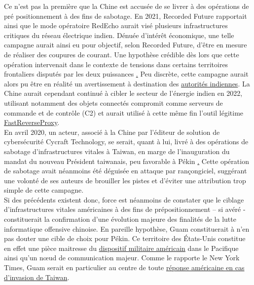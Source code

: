 \documentclass[a4paper]{article}
\begin{document}
Ce n’est pas la première que la Chine est accusée de se livrer à des opérations de pré positionnement à des fins de sabotage. En 2021, Recorded Future rapportait ainsi que le mode opératoire RedEcho aurait visé plusieurs infrastructures critiques du réseau électrique indien. Dénuée d’intérêt économique, une telle campagne aurait ainsi eu pour objectif, selon Recorded Future, d’être en mesure de réaliser des coupures de courant. Une hypothèse crédible dès lors que cette opération intervenait dans le contexte de tensions dans certains territoires frontaliers disputés par les deux puissances \href{https://troopers.de/downloads/troopers22/TR22_TinkerTelcoSoldierSpy.pdf}. Peu discrète, cette campagne aurait alors pu être en réalité un avertissement à destination des \href{https://www.intrinsec.com/wp-content/uploads/2023/04/Intrinsec-TLP_White_report_-Final.pdf}
{autorités indiennes}. La Chine aurait cependant continué à cibler le secteur de l’énergie indien en 2022, utilisant notamment des objets connectés compromit comme serveurs de commande et de contrôle (C2) et aurait utilisé à cette même fin l’outil légitime \href{https://www.microsoft.com/en-us/security/blog/2023/05/24/volt-typhoon-targets-us-critical-infrastructure-with-living-off-the-land-techniques/}{FastReverseProxy}. 
\\

En avril 2020, un acteur, associé à la Chine par l’éditeur de solution de cybersécurité Cycraft Technology, se serait, quant à lui, livré à des opérations de sabotage d’infrastructures vitales à Taiwan, en marge de l’inauguration du mandat du nouveau Président taiwanais, peu favorable à Pékin \href{https://medium.com/cycraft/china-linked-threat-group-targets-taiwan-critical-infrastructure-smokescreen-ransomware-c2a155aa53d5}. Cette opération de sabotage avait néanmoins été déguisée en attaque par rançongiciel, suggérant une volonté de ses auteurs de brouiller les pistes et d’éviter une attribution trop simple de cette campagne.
\\

Si des précédents existent donc, force est néanmoins de constater que le ciblage d’infrastructures vitales américaines à des fins de prépositionnement – si avéré - constituerait la confirmation d’une évolution majeure des finalités de la lutte informatique offensive chinoise. En pareille hypothèse, Guam constituerait à n’en pas douter une cible de choix pour Pékin. Ce territoire des États-Unis constitue en effet une pièce maitresse du \href{https://en.wikipedia.org/wiki/Andersen_Air_Force_Base}{dispositif militaire américain} dans le Pacifique ainsi qu’un nœud de communication majeur. Comme le rapporte le New York Times, Guam serait en particulier au centre de toute \href{https://media.defense.gov/2023/May/24/2003229517/-1/-1/0/CSA_Living_off_the_Land.PDF}{réponse américaine en cas d’invasion de Taiwan}. 
\\
\end{document}

